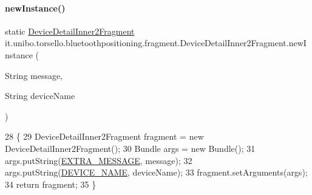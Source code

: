 \paragraph{\texorpdfstring{new\+Instance()}{newInstance()}}
{\footnotesize\ttfamily static \hyperlink{classit_1_1unibo_1_1torsello_1_1bluetoothpositioning_1_1fragment_1_1DeviceDetailInner2Fragment}{Device\+Detail\+Inner2\+Fragment} it.\+unibo.\+torsello.\+bluetoothpositioning.\+fragment.\+Device\+Detail\+Inner2\+Fragment.\+new\+Instance (\begin{DoxyParamCaption}\item[{String}]{message,  }\item[{String}]{device\+Name }\end{DoxyParamCaption})\hspace{0.3cm}{\ttfamily [static]}}


\begin{DoxyCode}
28                                                                                             \{
29         DeviceDetailInner2Fragment fragment = \textcolor{keyword}{new} DeviceDetailInner2Fragment();
30         Bundle args = \textcolor{keyword}{new} Bundle();
31         args.putString(\hyperlink{classit_1_1unibo_1_1torsello_1_1bluetoothpositioning_1_1fragment_1_1DeviceDetailInner2Fragment_a5093b051b0d458a870b6eef51b088e7d_a5093b051b0d458a870b6eef51b088e7d}{EXTRA\_MESSAGE}, message);
32         args.putString(\hyperlink{classit_1_1unibo_1_1torsello_1_1bluetoothpositioning_1_1fragment_1_1DeviceDetailInner2Fragment_aa28d537983d4cf578120a9c51eb2b0bb_aa28d537983d4cf578120a9c51eb2b0bb}{DEVICE\_NAME}, deviceName);
33         fragment.setArguments(args);
34         \textcolor{keywordflow}{return} fragment;
35     \}
\end{DoxyCode}
\hypertarget{classit_1_1unibo_1_1torsello_1_1bluetoothpositioning_1_1fragment_1_1DeviceDetailInner2Fragment_a0f0b6b90d40bb3f44a66de91da787f75_a0f0b6b90d40bb3f44a66de91da787f75}{}\label{classit_1_1unibo_1_1torsello_1_1bluetoothpositioning_1_1fragment_1_1DeviceDetailInner2Fragment_a0f0b6b90d40bb3f44a66de91da787f75_a0f0b6b90d40bb3f44a66de91da787f75} 
